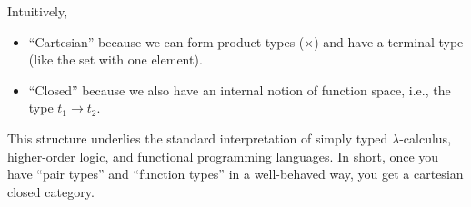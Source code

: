 Intuitively, \begin{itemize}
	\item ``Cartesian'' because we can form product types ($\times$) and have a terminal type (like the set with one element).
	\item ``Closed'' because we also have an internal notion of function space, i.e., the type $t_1\to t_2$.
\end{itemize}
This structure underlies the standard interpretation of simply typed $\lambda$-calculus, higher-order logic, and functional programming languages. In short, once you have ``pair types'' and ``function types'' in a well-behaved way, you get a cartesian closed category.



